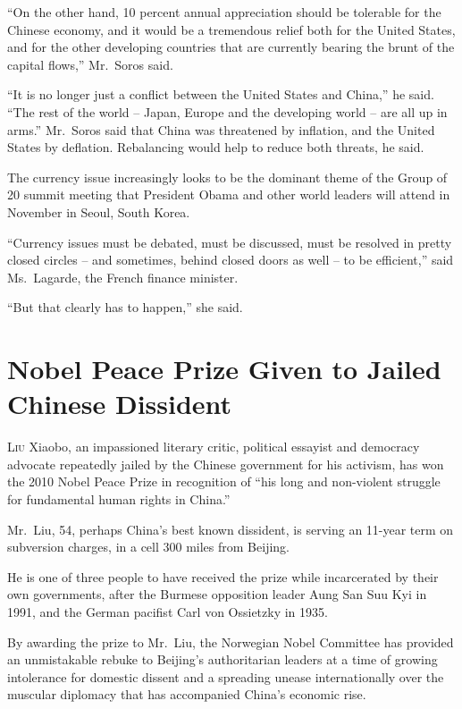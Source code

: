 ﻿\documentclass[12pt]{article}
\begin{document}
``On the other hand, 10 percent annual appreciation should be tolerable for the Chinese economy, and
it would be a tremendous relief both for the United States, and for the other developing countries
that are currently bearing the brunt of the capital flows,'' Mr.~Soros said.

``It is no longer just a conflict between the United States and China,'' he said. ``The rest of the
world -- Japan, Europe and the developing world -- are all up in arms.'' Mr.~Soros said that China
was threatened by inflation, and the United States by deflation. Rebalancing would help to reduce
both threats, he said.

The currency issue increasingly looks to be the dominant theme of the Group of 20 summit meeting
that President Obama and other world leaders will attend in November in Seoul, South Korea.

``Currency issues must be debated, must be discussed, must be resolved in pretty closed circles --
and sometimes, behind closed doors as well -- to be efficient,'' said Ms.~Lagarde, the French
finance minister.

``But that clearly has to happen,'' she said.

\section{Nobel Peace Prize Given to Jailed Chinese Dissident}


\lettrine{L}{iu} Xiaobo, an impassioned literary critic, political essayist
and democracy advocate repeatedly jailed by the Chinese government for his activism, has won the
2010 Nobel Peace Prize in recognition of ``his long and non-violent struggle for fundamental human
rights in China.''

Mr.~Liu, 54, perhaps China's best known dissident, is serving an 11-year term on subversion charges,
in a cell 300 miles from Beijing.

He is one of three people to have received the prize while incarcerated by their own governments,
after the Burmese opposition leader Aung San Suu Kyi in 1991, and the German pacifist Carl von
Ossietzky in 1935.

By awarding the prize to Mr.~Liu, the Norwegian Nobel Committee has provided an unmistakable rebuke
to Beijing's authoritarian leaders at a time of growing intolerance for domestic dissent and a
spreading unease internationally over the muscular diplomacy that has accompanied China's economic
rise.
\end{document}
